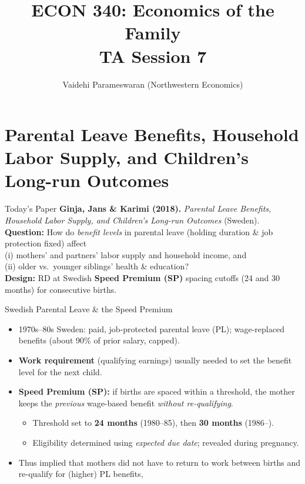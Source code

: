 \documentclass[11pt,notes=hide,aspectratio=169,mathserif]{beamer}
\title[class]{ECON 340: Economics of the Family \\ TA Session 7}
\author[Vaidehi's class]{Vaidehi Parameswaran (Northwestern Economics)}
\date{\monthname[\the\month] \the\year}
\begin{document}
\begin{frame}[plain]
\titlepage
\end{frame}


\section{Parental Leave Benefits, Household Labor Supply, and Children’s Long-run Outcomes}

\begin{frame}{Today's Paper}
\small
\textbf{Ginja, Jans \& Karimi (2018).} \emph{Parental Leave Benefits, Household Labor Supply, and Children’s Long-run Outcomes} (Sweden).\\[0.6em]
\textbf{Question:} How do \emph{benefit levels} in parental leave (holding duration \& job protection fixed) affect\\
\hspace{1.2em}(i) mothers’ and partners’ labor supply and household income, and\\
\hspace{1.2em}(ii) older vs.\ younger siblings’ health \& education?\\[0.4em]
\textbf{Design:} RD at Swedish \textbf{Speed Premium (SP)} spacing cutoffs (24 and 30 months) for consecutive births.
\end{frame}


\begin{frame}{Swedish Parental Leave \& the Speed Premium}
\small
\begin{itemize}
  \item 1970s–80s Sweden: paid, job-protected parental leave (PL); wage-replaced benefits (about 90\% of prior salary, capped).
  \item \textbf{Work requirement} (qualifying earnings) usually needed to set the benefit level for the next child.
  \item \textbf{Speed Premium (SP):} if births are spaced within a threshold, the mother keeps the \emph{previous} wage-based benefit \emph{without re-qualifying}.
  \begin{itemize}
    \item Threshold set to \textbf{24 months} (1980–85), then \textbf{30 months} (1986–).
    \item Eligibility determined using \emph{expected due date}; revealed during pregnancy.
  \end{itemize}
  \item Thus implied that mothers did not have to return to work between births and re-qualify for (higher) PL benefits,
\end{itemize}
\end{frame}
\end{document}
